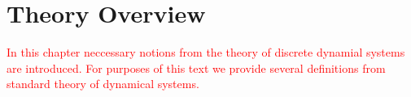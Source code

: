 \chapter{Theory Overview}

\textcolor{red}{
In this chapter neccessary notions from the theory of discrete dynamial systems are introduced.
For purposes of this text we provide several definitions from standard theory of dynamical systems.
}




\endinput